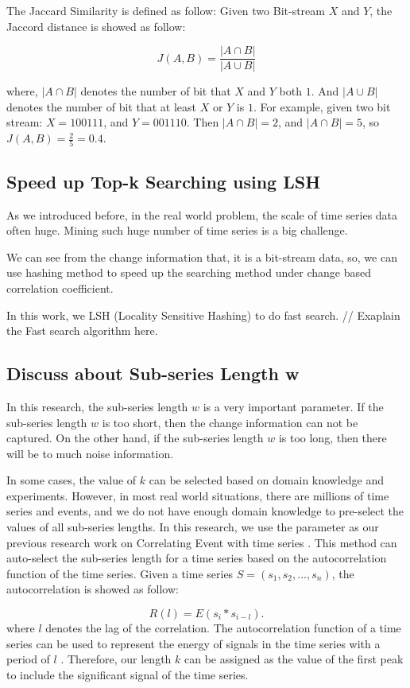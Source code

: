 The Jaccard Similarity \cite{han2011data} is defined as follow:
Given two Bit-stream $X$ and $Y$, the Jaccord distance is showed as follow:

\begin{equation}
J(A,B) = \frac{|A \cap B|}{|A \cup B|}
\end{equation}

where, $|A \cap B|$ denotes the number of bit that $X$ and $Y$ both $1$. And $|A \cup B|$ denotes the number of bit that at least $X$ or $Y$ is $1$.
For example, given two bit stream: $X={100111}$, and $Y={001110}$. Then $|A \cap B| = 2$, and $|A \cap B| = 5$, so $J(A,B) = \frac{2}{5} = 0.4$.


\subsection{Speed up Top-k Searching using LSH}

As we introduced before, in the real world problem, the scale of time series data often huge. Mining such huge number of time series is a big challenge.

We can see from the change information that, it is a bit-stream data, so, we can use hashing method to speed up the searching method under change based correlation coefficient.

In this work, we LSH (Locality Sensitive Hashing) \cite{indyk1998approximate} to do fast search.
// Exaplain the Fast search algorithm here.


\subsection{Discuss about Sub-series Length w}

In this research, the sub-series length $w$ is a very important parameter.
If the sub-series length $w$ is too short, then the change information can not be captured. On the other hand, if the sub-series length $w$ is too long, then there will be to much noise information.

In some cases, the value of $k$ can be selected based on domain knowledge and experiments. However, in most real world situations, there are millions of time series and events, and we do not have enough domain knowledge to pre-select the values of all sub-series lengths. In this research, we use the parameter as our previous research work on Correlating Event with time series \cite{luo2014correlating}.
This method can auto-select the sub-series length for a time series based on the autocorrelation function \cite{hamilton1994time} of the time series.
Given a time series $S=(s_1,s_2,...,s_n)$, the autocorrelation is showed as follow:

\begin{equation}
R(l) = E(s_i*s_{i-l}).
\end{equation}
where $l$ denotes the lag of the correlation. The autocorrelation function of a time series can be used to represent the energy of signals in the time series with a period of $l$ \cite{hamilton1994time}. Therefore, our length $k$ can be assigned as the value of the first peak to include the significant signal of the time series. 
